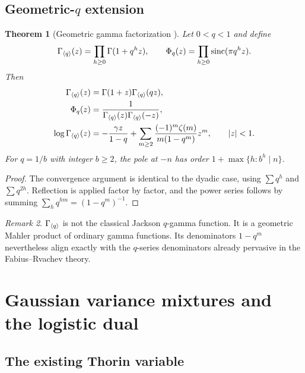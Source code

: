 \documentclass[11pt]{article}
\newtheorem{theorem}{Theorem}[section]
\theoremstyle{definition}
\theoremstyle{remark}
\newtheorem{remark}[theorem]{Remark}
\begin{document}
\subsection{Geometric-\texorpdfstring{$q$}{q} extension}

\begin{theorem}[Geometric gamma factorization \New]
Let $0<q<1$ and define
\begin{equation}
 \Gamma_{\langle q\rangle}(z)=\prod_{h\ge0}\Gamma(1+q^hz),
 \qquad
 \Phi_q(z)=\prod_{h\ge0}\operatorname{sinc}(\pi q^hz).                \label{p2:eq:q-geometric-gamma}
\end{equation}
Then
\begin{align}
 \Gamma_{\langle q\rangle}(z)&=\Gamma(1+z)\Gamma_{\langle q\rangle}(qz),               \label{p2:eq:q-gamma-Mahler}\\
 \Phi_q(z)&=\frac{1}{\Gamma_{\langle q\rangle}(z)\Gamma_{\langle q\rangle}(-z)},       \label{p2:eq:q-gamma-reflection}\\
 \log\Gamma_{\langle q\rangle}(z)
 &=-\frac{\gamma z}{1-q}
 +\sum_{m\ge2}\frac{(-1)^m\zeta(m)}{m(1-q^m)}z^m,
 \qquad |z|<1.                                           \label{p2:eq:q-gamma-series}
\end{align}
For $q=1/b$ with integer $b\ge2$, the pole at $-n$ has order
$1+\max\{h:b^h\mid n\}$.
\end{theorem}

\begin{proof}
The convergence argument is identical to the dyadic case, using
$\sum q^h$ and $\sum q^{2h}$.  Reflection is applied factor by factor, and the power series
follows by summing $\sum_hq^{hm}=(1-q^m)^{-1}$.
\end{proof}

\begin{remark}
$\Gamma_{\langle q\rangle}$ is not the classical Jackson $q$-gamma function.  It is a geometric Mahler
product of ordinary gamma functions.  Its denominators $1-q^m$ nevertheless align exactly
with the $q$-series denominators already pervasive in the Fabius--Rvachev theory.
\end{remark}

\section{Gaussian variance mixtures and the logistic dual}
\label{p2:sec:gaussian-mixture}

\subsection{The existing Thorin variable}
\end{document}
